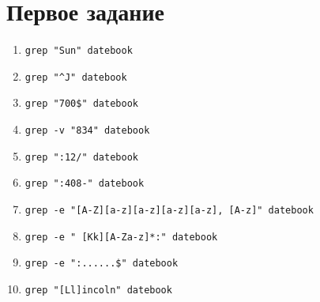 \documentclass[12pt, a4paper]{article}
\begin{document}

\section{Первое задание}
\begin{enumerate}
  \item \verb|grep "Sun" datebook|
  \item \verb|grep "^J" datebook|
  \item \verb|grep "700$" datebook|
  \item \verb|grep -v "834" datebook|
  \item \verb|grep ":12/" datebook|
  \item \verb|grep ":408-" datebook|
  \item \verb|grep -e "[A-Z][a-z][a-z][a-z][a-z], [A-z]" datebook|
  \item \verb|grep -e " [Kk][A-Za-z]*:" datebook|
  \item \verb|grep -e ":......$" datebook|
  \item \verb|grep "[Ll]incoln" datebook|
\end{enumerate}
\end{document}
